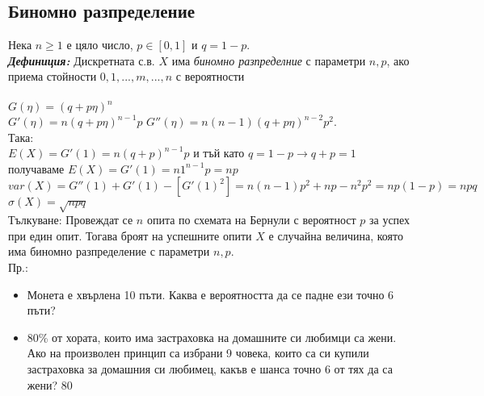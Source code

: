 \documentclass[11pt]{article} %
\newcommand{\italicBold}[1]{\textbf{\emph{#1}}}
\newcommand{\definition}{\italicBold{Дефиниция: }}
\begin{document}
\subsection{Биномно разпределение}
Нека $n \geq 1$ е цяло число, $p \in [0,1]$ и $q=1-p$.\\
\definition Дискретната с.в. $X$ има \textit{биномно разпределние} с параметри $n, p$, ако приема стойности $0,1,...,m,...,n$ с вероятности\\\\
$G(\eta)=(q+p\eta)^{n}$\\
$G'(\eta)=n(q+p\eta)^{n-1}p$
$G''(\eta)=n(n-1)(q+p\eta)^{n-2}p^{2}$.\\ 
Така:\\
$E(X)=G'(1)=n(q+p)^{n-1}p$ и тъй като $q=1-p \rightarrow q+p=1$ получаваме $E(X)=G'(1)=n1^{n-1}p=np$\\
$var(X)=G''(1)+G'(1)-[G'(1)^{2}]=n(n-1)p^{2}+np-n^{2}p^{2}=np(1-p)=npq$\\
$\sigma(X)=\sqrt{npq}$\\

Тълкуване: Провеждат се $n$ опита по схемата на Бернули с вероятност $p$ за успех при един опит. Тогава броят на успешните опити $X$ е случайна величина, която има биномно разпределение с параметри $n, p$.\\
Пр.:
\begin{itemize}
	\item Монета е хвърлена 10 пъти. Каква е вероятността да се падне ези точно 6 пъти?\\
	\item 80\% от хората, които има застраховка на домашните си любимци са жени. Ако на произволен принцип са избрани 9 човека, които са си купили застраховка за домашния си любимец, какъв е шанса точно 6 от тях да са жени? 
	80%
\end{itemize}


 
\end{document}

